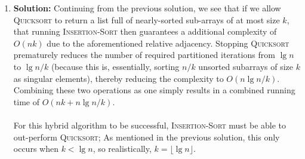 \documentclass{article}
\begin{document}
\begin{enumerate}
\item \textbf{Solution:} Continuing from the previous solution, we see that if we allow \textsc{Quicksort} to return a list full of nearly-sorted sub-arrays of at most size $k$, that running \textsc{Insertion-Sort} then guarantees a additional complexity of $O(nk)$ due to the aforementioned relative adjacency. Stopping \textsc{Quicksort} prematurely reduces the number of required partitioned iterations from $\lg{n}$ to $\lg{n/k}$ (because this is, essentially, sorting $n/k$ unsorted subarrays of size $k$ as singular elements), thereby reducing the complexity to $O(n\lg{n/k})$. Combining these two operations as one simply results in a combined running time of $O(nk + n\lg{n/k})$. \\ \\
For this hybrid algorithm to be successful, \textsc{Insertion-Sort} must be able to out-perform \textsc{Quicksort}; As mentioned in the previous solution, this only occurs when $k < \lg{n}$, so realistically, $k = \lfloor\lg{n}\rfloor$.


\end{enumerate}
\end{document}
